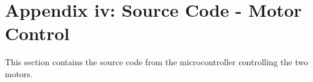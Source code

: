 \documentclass[a4paper,12pt]{article} %
\begin{document}
\section{Appendix iv: Source Code - Motor Control} %
This section contains the source code from the microcontroller controlling the two motors.
\vspace{5mm}
\linespread{1}

\linespread{1.6}
\vspace{5mm}
\end{document}

